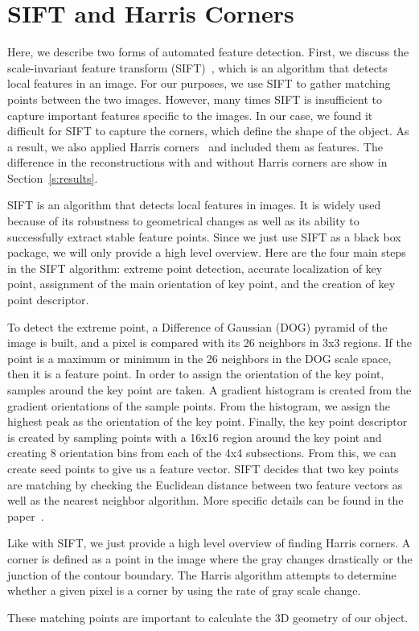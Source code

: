 \section{SIFT and Harris Corners}
\label{s:sift}

Here, we describe two forms of automated feature detection. First, we discuss the scale-invariant feature transform (SIFT)~\cite{SIFT}, which is an algorithm that detects local features in an image. For our purposes, we use SIFT to gather matching points between the two images. However, many times SIFT is insufficient to capture important features specific to the images. In our case, we found it difficult for SIFT to capture the corners, which define the shape of the object. As a result, we also applied Harris corners~\cite{Corners} and included them as features. The difference in the reconstructions with and without Harris corners are show in Section~\ref{s:results}.

SIFT is an algorithm that detects local features in images. It is widely used because of its robustness to geometrical changes as well as its ability to successfully extract stable feature points. Since we just use SIFT as a black box package, we will only provide a high level overview. Here are the four main steps in the SIFT algorithm: extreme point detection, accurate localization of key point, assignment of the main orientation of key point, and the creation of key point descriptor. 

To detect the extreme point, a Difference of Gaussian (DOG) pyramid of the image is built, and a pixel is compared with its 26 neighbors in 3x3 regions. If the point is a maximum or minimum in the 26 neighbors in the DOG scale space, then it is a feature point. In order to assign the orientation of the key point, samples around the key point are taken. A gradient histogram is created from the gradient orientations of the sample points. From the histogram, we assign the highest peak as the orientation of the key point. Finally, the key point descriptor is created by sampling points with a 16x16 region around the key point and creating 8 orientation bins from each of the 4x4 subsections. From this, we can create seed points to give us a feature vector. SIFT decides that two key points are matching by checking the Euclidean distance between two feature vectors as well as the nearest neighbor algorithm. More specific details can be found in the paper~\cite{SIFT}.

Like with SIFT, we just provide a high level overview of finding Harris corners. A corner is defined as a point in the image where the gray changes drastically or the junction of the contour boundary. The Harris algorithm attempts to determine whether a given pixel is a corner by using the rate of gray scale change. 

These matching points are important to calculate the 3D geometry of our object.